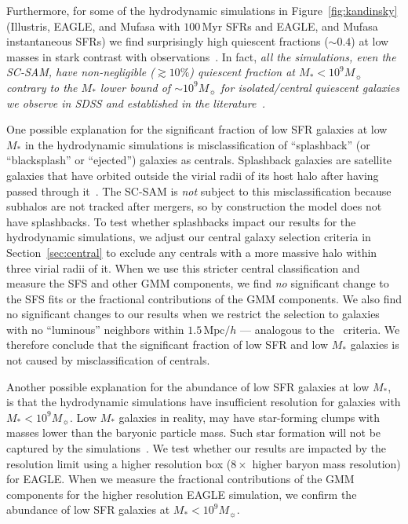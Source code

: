 \documentclass[tighten, preprint]{aastex62}
\begin{document}
Furthermore, for some of the hydrodynamic simulations in 
Figure~\ref{fig:kandinsky} (Illustris, EAGLE, and {\sc Mufasa} with 
$100\,\mathrm{Myr}$ SFRs and EAGLE, and {\sc Mufasa} instantaneous SFRs)
we find surprisingly high quiescent fractions (${\sim}0.4$) at low masses in stark 
contrast with observations~\citep{baldry2006,peng2010,hahn2015}. In fact, 
\emph{all the simulations, even the SC-SAM, have non-negligible (${\gtrsim}10\%$) 
quiescent fraction at $M_*{<}10^9 M_\sun$ contrary to the $M_*$ lower bound of 
${\sim}10^9M_\sun$ for isolated/central quiescent galaxies 
we observe in SDSS and established in the literature~\citep[\emph{e.g.}][]{geha2012}.}

One possible explanation for the significant fraction of low SFR galaxies
at low $M_*$ in the hydrodynamic simulations is misclassification of 
``splashback'' (or ``blacksplash'' or ``ejected'') galaxies as centrals. 
Splashback galaxies are satellite galaxies that have orbited outside 
the virial radii of its host halo after having passed through 
it~\citep[\emph{e.g.}][]{mamon2004,gill2005,wang2009a,wetzel2014}.
The SC-SAM is {\em not} subject to this misclassification 
because subhalos are not tracked after mergers, so by construction the 
model does not have splashbacks. To test whether splashbacks 
impact our results for the hydrodynamic simulations, we adjust our central
galaxy selection criteria in Section~\ref{sec:central} to exclude 
any centrals with a more massive halo within three virial radii of it. 
When we use this stricter central classification and measure the
SFS and other GMM components, we find \emph{no} significant change to 
the SFS fits or the fractional contributions of the GMM components. 
We also find no significant changes to our results when we restrict 
the selection to galaxies with no ``luminous'' neighbors within 
$1.5\,\mathrm{Mpc}/h$ --- analogous to the~\cite{geha2012} criteria.
We therefore conclude that the significant fraction of low SFR and 
low $M_*$ galaxies is not caused by misclassification of centrals.

Another possible explanation for the abundance of low SFR galaxies
at low $M_*$, is that the hydrodynamic simulations have insufficient
resolution for galaxies with $M_*< 10^9M_\sun$. Low $M_*$ galaxies 
in reality, may have star-forming clumps with masses lower than the 
baryonic particle mass. Such star formation will not be captured by 
the simulations~\citep{sparre2017a}. We test whether our results are 
impacted by the resolution limit using a higher resolution box ($8\times$ 
higher baryon mass resolution) for EAGLE. When we measure the fractional 
contributions of the GMM components for the higher resolution EAGLE 
simulation, we confirm the abundance of low SFR galaxies at 
$M_*<10^9M_\sun$.  
\end{document}
